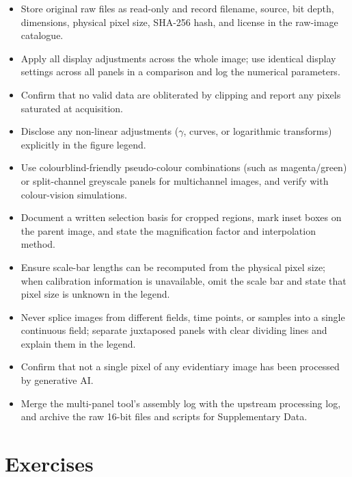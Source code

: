 \begin{itemize}
\item Store original raw files as read-only and record filename, source, bit depth, dimensions, physical pixel size, SHA-256 hash, and license in the raw-image catalogue.
\item Apply all display adjustments across the whole image; use identical display settings across all panels in a comparison and log the numerical parameters.
\item Confirm that no valid data are obliterated by clipping and report any pixels saturated at acquisition.
\item Disclose any non-linear adjustments ($\gamma$, curves, or logarithmic transforms) explicitly in the figure legend.
\item Use colourblind-friendly pseudo-colour combinations (such as magenta/green) or split-channel greyscale panels for multichannel images, and verify with colour-vision simulations.
\item Document a written selection basis for cropped regions, mark inset boxes on the parent image, and state the magnification factor and interpolation method.
\item Ensure scale-bar lengths can be recomputed from the physical pixel size; when calibration information is unavailable, omit the scale bar and state that pixel size is unknown in the legend.
\item Never splice images from different fields, time points, or samples into a single continuous field; separate juxtaposed panels with clear dividing lines and explain them in the legend.
\item Confirm that not a single pixel of any evidentiary image has been processed by generative AI.
\item Merge the multi-panel tool's assembly log with the upstream processing log, and archive the raw 16-bit files and scripts for Supplementary Data.
\end{itemize}

\section{Exercises}

